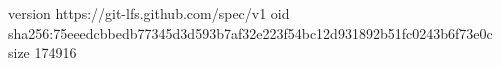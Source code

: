 version https://git-lfs.github.com/spec/v1
oid sha256:75eeedcbbedb77345d3d593b7af32e223f54bc12d931892b51fc0243b6f73e0c
size 174916
